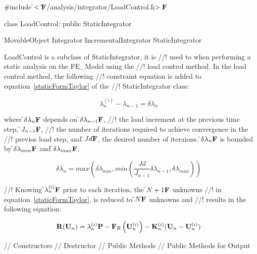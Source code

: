 
\indent \#include \f$<\tilde{ }{\bf F}$/analysis/integrator/LoadControl.h\f$>{\bf F}$

\indent class LoadControl: public StaticIntegrator

\indent MovableObject
\indent\indent Integrator
\indent\indent\indent IncrementalIntegrator
\indent\indent\indent\indent StaticIntegrator
\indent\indent\indent\indent{}

\indent LoadControl is a subclass of StaticIntegrator, it is
//! used to when performing a static analysis on the FE\_Model using the
//! load control method. In the load control method, the following
//! constraint equation is added to equation~\ref{staticFormTaylor} of the
//! StaticIntegrator class: 

\[ 
\lambda_n^{(i)} - \lambda_{n-1} = \delta \lambda_n
\]

\noindent where \f$\delta \lambda_n{\bf F}$ depends on \f$\delta \lambda_{n-1}{\bf F}$,
//! the load increment at the previous time step, \f$J_{n-1}{\bf F}$,
//! the number of iterations required to achieve convergence in the
//! previos load step, and \f$Jd{\bf F}$, the desired number of iteraions. \f$\delta
\lambda_n{\bf F}$ is bounded by \f$\delta \lambda_{min}{\bf F}$  and \f$\delta \lambda_{max}{\bf F}$.


\[ 
\delta \lambda_n = max \left( \delta \lambda_{min}, min \left(
\frac{Jd}{J_{n-1}} \delta \lambda_{n-1}, \delta \lambda_{max} \right) \right)
\]

//! Knowing \f$\lambda_n^{(i)}{\bf F}$ prior to each iteration, the \f$N+1{\bf F}$ unknowns
//! in equation~\ref{staticFormTaylor}, is reduced to \f$N{\bf F}$ unknowns and
//! results in the following equation:

\begin{equation} 
{\bf R}({\bf U}_{n}) = \lambda_n^{(i)} {\bf P} 
 - {\bf F}_{R}\left({\bf U}_{n}^{(i)} \right) - 
{\bf K}_n^{(i)} 
({\bf U}_{n} - {\bf U}_{n}^{(i)})  
\label{staticFormLoadControl}
\end{equation} 

\indent // Constructors
\indent // Destructor
\indent // Public Methods
\indent // Public Methods for Output

